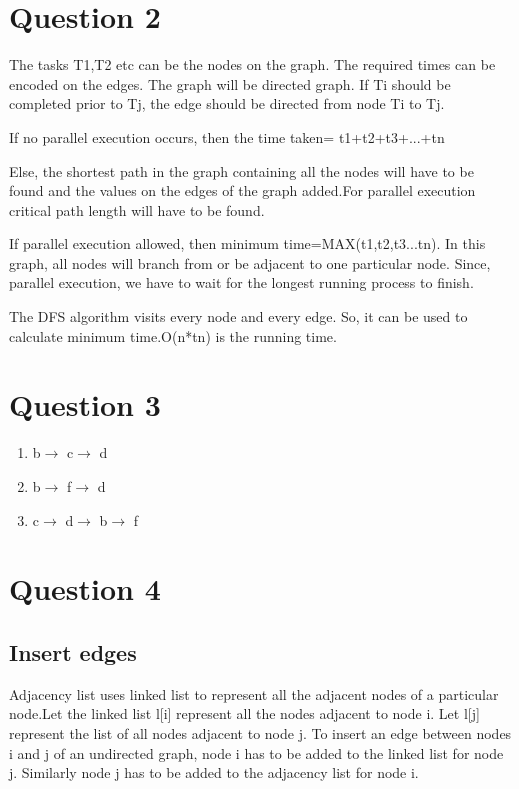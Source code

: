 \documentclass{article}
\begin{document}
\section*{Question 2}

The tasks T1,T2 etc can be the nodes on the graph. The required times can be encoded on the edges. The graph will be directed graph.
If Ti should be completed prior to Tj, the edge should be directed from node Ti to Tj.

If no parallel execution occurs, then the time taken= t1+t2+t3+...+tn

Else, the shortest path  in the graph containing all the nodes will have to be found and the values on the edges of the graph added.For parallel execution critical path length will have
to be found.

If parallel execution allowed, then minimum time=MAX(t1,t2,t3...tn). In this graph, all nodes will branch from or be adjacent to one particular node. Since, parallel execution, we have to wait for the
 longest running process to finish.

The DFS algorithm visits every node and every edge. So, it can be used to calculate minimum time.O(n*tn) is the running time.

\section*{Question 3}
\begin{enumerate}
\item b$\rightarrow$ c$\rightarrow$ d
\item b$\rightarrow$ f$\rightarrow$ d
\item c$\rightarrow$ d$\rightarrow$ b$\rightarrow$ f
\end{enumerate}

\section*{Question 4}

\subsection*{Insert edges}
Adjacency list uses linked list to represent all the adjacent nodes of a particular node.Let the linked list l[i] represent all the nodes adjacent to node i.
Let l[j] represent the list of all nodes adjacent to node j. To insert an edge between nodes i and j of an undirected graph, node i has to be added to the linked list for node j. 
Similarly node j has to be added to the adjacency list for node i.
\end{document}
